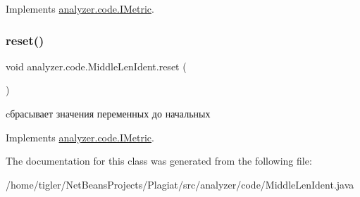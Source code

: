 Implements \hyperlink{interfaceanalyzer_1_1code_1_1IMetric}{analyzer.\+code.\+I\+Metric}.

\mbox{\label{classanalyzer_1_1code_1_1MiddleLenIdent_ac88413fab29f0d35a48e32c3471eb82b}} 
\subsubsection{\texorpdfstring{reset()}{reset()}}
{\footnotesize\ttfamily void analyzer.\+code.\+Middle\+Len\+Ident.\+reset (\begin{DoxyParamCaption}{ }\end{DoxyParamCaption})\hspace{0.3cm}{\ttfamily [inline]}}

cбрасывает значения переменных до начальных 

Implements \hyperlink{interfaceanalyzer_1_1code_1_1IMetric}{analyzer.\+code.\+I\+Metric}.



The documentation for this class was generated from the following file\+:\begin{DoxyCompactItemize}
\item 
/home/tigler/\+Net\+Beans\+Projects/\+Plagiat/src/analyzer/code/Middle\+Len\+Ident.\+java\end{DoxyCompactItemize}
